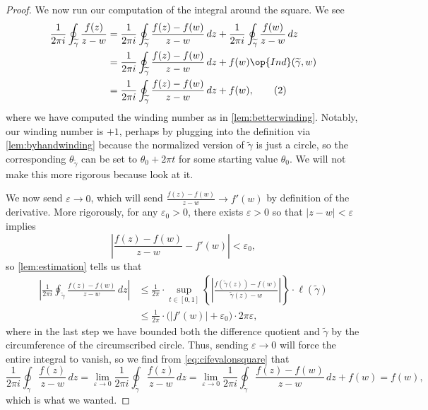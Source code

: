 \begin{proof}
	We now run our computation of the integral around the square. We see
	\begin{align*}
		\frac1{2\pi i}\oint_{\widetilde\gamma}\frac{f(z)}{z-w} &= \frac1{2\pi i}\oint_{\widetilde\gamma}\frac{f(z)-f(w)}{z-w}\,dz+\frac1{2\pi i}\oint_{\widetilde\gamma}\frac{f(w)}{z-w}\,dz \\
		&= \frac1{2\pi i}\oint_{\widetilde\gamma}\frac{f(z)-f(w)}{z-w}\,dz+f(w)\op{Ind}(\widetilde\gamma,w) \\
		&= \frac1{2\pi i}\oint_{\widetilde\gamma}\frac{f(z)-f(w)}{z-w}\,dz+f(w), \tag{2}\label{eq:cifevalonsquare}
	\end{align*}
	where we have computed the winding number as in \autoref{lem:betterwinding}. Notably, our winding number is $+1$, perhaps by plugging into the definition via \autoref{lem:byhandwinding} because the normalized version of $\widetilde\gamma$ is just a circle, so the corresponding $\theta_{\widetilde\gamma}$ can be set to $\theta_0+2\pi t$ for some starting value $\theta_0$. We will not make this more rigorous because look at it.

	We now send $\varepsilon\to0$, which will send $\frac{f(z)-f(w)}{z-w}\to f'(w)$ by definition of the derivative. More rigorously, for any $\varepsilon_0>0$, there exists $\varepsilon>0$ so that $|z-w|<\varepsilon$ implies
	\[\left|\frac{f(z)-f(w)}{z-w}-f'(w)\right|<\varepsilon_0,\]
	so \autoref{lem:estimation} tells us that
	\begin{align*}
		\left|\frac1{2\pi i}\oint_{\widetilde\gamma}\frac{f(z)-f(w)}{z-w}\,dz\right| &\le \frac1{2\pi}\cdot\sup_{t\in[0,1]}\left\{\left|\frac{f(\widetilde\gamma(z))-f(w)}{\widetilde\gamma(z)-w}\right|\right\}\cdot\ell(\widetilde\gamma) \\
		&\le \frac1{2\pi}\cdot\big(|f'(w)|+\varepsilon_0\big)\cdot2\pi\varepsilon,
	\end{align*}
	where in the last step we have bounded both the difference quotient and $\widetilde\gamma$ by the circumference of the circumscribed circle. Thus, sending $\varepsilon\to0$ will force the entire integral to vanish, so we find from \autoref{eq:cifevalonsquare} that
	\[\frac1{2\pi i}\oint_\gamma\frac{f(z)}{z-w}\,dz=\lim_{\varepsilon\to0}\frac1{2\pi i}\oint_{\widetilde\gamma}\frac{f(z)}{z-w}\,dz=\lim_{\varepsilon\to0}\frac1{2\pi i}\oint_{\widetilde\gamma}\frac{f(z)-f(w)}{z-w}\,dz+f(w)=f(w),\]
	which is what we wanted.
\end{proof}

